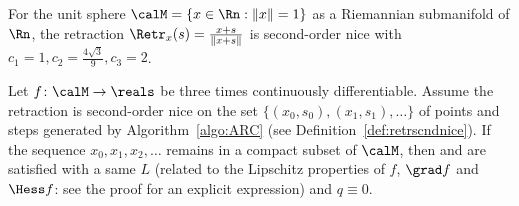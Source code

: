 \begin{proposition}\label{prop:sphereretrnice}
	For the unit sphere $\calM = \{ x\in\Rn : \|x\| = 1 \}$ as a Riemannian submanifold of $\Rn$, the retraction $\Retr_x(s) = \frac{x+s}{\|x+s\|}$ is second-order nice with $c_1 = 1, c_2 = \frac{4\sqrt{3}}{9}, c_3 = 2$.
\end{proposition}
\begin{theorem} \label{thm:regularitycompact}
	Let $f \colon \calM \to \reals$ be three times continuously differentiable.
	Assume the retraction is second-order nice on the set $\{(x_0, s_0), (x_1, s_1), \ldots \}$ of points and steps  generated by Algorithm~\ref{algo:ARC} (see Definition~\ref{def:retrscndnice}).
	If the sequence $x_0, x_1, x_2, \ldots$ remains in a compact subset of $\calM$,
	then  and  are satisfied
	with a same $L$ (related to the Lipschitz properties of $f$, $\grad f$ and $\Hess f$: see the proof for an explicit expression) and $q \equiv 0$.
	

\end{theorem}
